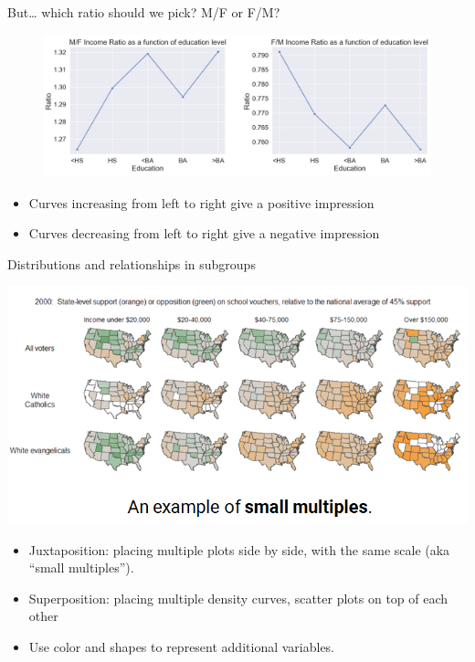 \documentclass[aspectratio=169]{../latex_main/tntbeamer}  %
\begin{document}
	\begin{frame}{But… which ratio should we pick? M/F or F/M?}
	    \begin{figure}
	        \centering
	        \includegraphics[scale=.38]{Bild58}
	    \end{figure}
	    
	    \begin{itemize}
	        \item Curves increasing from left to right give a positive impression
	        \item Curves decreasing from left to right give a negative impression
	    \end{itemize}
	    
	\end{frame}
	
	\begin{frame}{Distributions and relationships in subgroups}
	
	    \vspace{-2em}
	    \centering
	     \includegraphics[scale=.55]{Bild59}
	
	                \begin{itemize}
	                    \item Juxtaposition: placing multiple plots side by side, with the same scale (aka ``small multiples'').
	                    \item Superposition: placing multiple density curves, scatter plots on top of each other
	                    \item Use color and shapes to represent additional variables.
	                \end{itemize}

	\end{frame}
\end{document}

